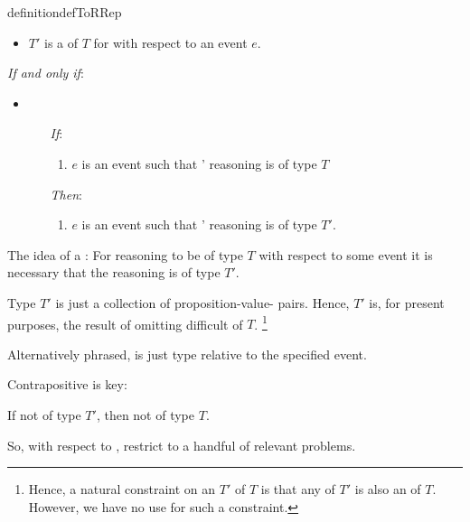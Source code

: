 \begin{note}
  \begin{restatable}[\rotor{2}]{definition}{defToRRep}
    \label{def:rotor}

    \begin{itemize}
    \item
      \(T'\) is a \emph{} of \(T\) for \vAgent{} with respect to an event \(e\).
    \end{itemize}

    \emph{If and only if}:

    \begin{itemize}
    \item

      \begin{itemize}
      \item[\emph{If}:]
        \begin{enumerate}[label=\alph*., ref=(\alph*), series=tRDef]
        \item
          \(e\) is an event such that \vAgent{}' reasoning is of type \(T\)
        \end{enumerate}
      \item[\emph{Then}:]
        \begin{enumerate}[label=\alph*., ref=(\alph*), resume*=tRDef]
        \item
          \(e\) is an event such that \vAgent{}' reasoning is of type \(T'\).
        \end{enumerate}
      \end{itemize}
    \end{itemize}
    \vspace{-\baselineskip}
  \end{restatable}

  The idea of a \tRep{}:
  For reasoning to be of type \(T\) with respect to some event it is necessary that the reasoning is of type \(T'\).

  Type \(T'\) is just a collection of proposition-value-\poP{} pairs.
  Hence, \(T'\) is, for present purposes, the result of omitting difficult  of \(T\).%
  \footnote{
    Hence, a natural constraint on an \tRep{} \(T'\) of \(T\) is that any \tI{} of \(T'\) is also an \tI{} of \(T\).
    However, we have no use for such a constraint.
  }

  Alternatively phrased, \rotor{} is just type relative to the specified event.

  Contrapositive is key:

  If not of type \(T'\), then not of type \(T\).

  So, with respect to , restrict to a handful of relevant problems.
\end{note}

